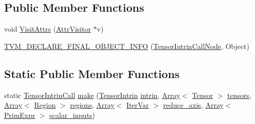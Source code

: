 \subsection*{Public Member Functions}
\begin{DoxyCompactItemize}
\item 
void \hyperlink{classtvm_1_1te_1_1TensorIntrinCallNode_a954f718be2ce35a4c518c8b1da43c1eb}{Visit\+Attrs} (\hyperlink{classtvm_1_1AttrVisitor}{Attr\+Visitor} $\ast$v)
\item 
\hyperlink{classtvm_1_1te_1_1TensorIntrinCallNode_a1c6b0b969f93e262aa9f95877a28588e}{T\+V\+M\+\_\+\+D\+E\+C\+L\+A\+R\+E\+\_\+\+F\+I\+N\+A\+L\+\_\+\+O\+B\+J\+E\+C\+T\+\_\+\+I\+N\+FO} (\hyperlink{classtvm_1_1te_1_1TensorIntrinCallNode}{Tensor\+Intrin\+Call\+Node}, Object)
\end{DoxyCompactItemize}
\subsection*{Static Public Member Functions}
\begin{DoxyCompactItemize}
\item 
static \hyperlink{classtvm_1_1te_1_1TensorIntrinCall}{Tensor\+Intrin\+Call} \hyperlink{classtvm_1_1te_1_1TensorIntrinCallNode_ab6674b8d925f19d0a2629a590f89407d}{make} (\hyperlink{classtvm_1_1te_1_1TensorIntrin}{Tensor\+Intrin} \hyperlink{classtvm_1_1te_1_1TensorIntrinCallNode_adf0605632cdbe20556abffee3aa3850e}{intrin}, \hyperlink{classtvm_1_1Array}{Array}$<$ \hyperlink{classtvm_1_1te_1_1Tensor}{Tensor} $>$ \hyperlink{classtvm_1_1te_1_1TensorIntrinCallNode_a92b543750ea55b9cfd6852139e2ddbd6}{tensors}, \hyperlink{classtvm_1_1Array}{Array}$<$ \hyperlink{namespacetvm_1_1tir_a8277e2a3d81a80a4776705673df51e0a}{Region} $>$ \hyperlink{classtvm_1_1te_1_1TensorIntrinCallNode_a4c934a6d85bf27b3263ad0d79fb17144}{regions}, \hyperlink{classtvm_1_1Array}{Array}$<$ \hyperlink{classtvm_1_1tir_1_1IterVar}{Iter\+Var} $>$ \hyperlink{classtvm_1_1te_1_1TensorIntrinCallNode_a3bd0fd4dc7145a22d38d62037838ccfe}{reduce\+\_\+axis}, \hyperlink{classtvm_1_1Array}{Array}$<$ \hyperlink{classtvm_1_1PrimExpr}{Prim\+Expr} $>$ \hyperlink{classtvm_1_1te_1_1TensorIntrinCallNode_a862c22c7362a799b0f44de41920bffc8}{scalar\+\_\+inputs})
\end{DoxyCompactItemize}
